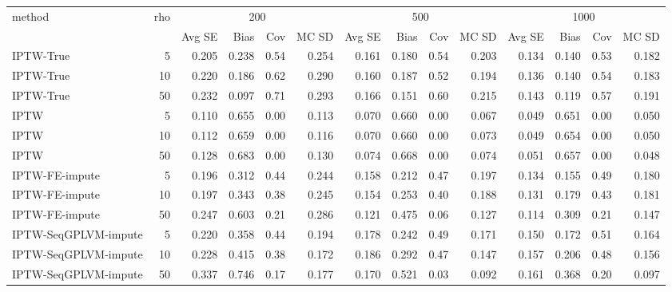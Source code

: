\begin{tabular}{l r|rrrr|rrrr|rrrr}
\toprule
method & rho & \multicolumn{4}{c|}{200} & \multicolumn{4}{c|}{500} & \multicolumn{4}{c}{1000} \\
 &  & Avg SE & Bias & Cov & MC SD & Avg SE & Bias & Cov & MC SD & Avg SE & Bias & Cov & MC SD \\
\midrule
IPTW-True & 5 & 0.205 & 0.238 & 0.54 & 0.254 & 0.161 & 0.180 & 0.54 & 0.203 & 0.134 & 0.140 & 0.53 & 0.182 \\
IPTW-True & 10 & 0.220 & 0.186 & 0.62 & 0.290 & 0.160 & 0.187 & 0.52 & 0.194 & 0.136 & 0.140 & 0.54 & 0.183 \\
IPTW-True & 50 & 0.232 & 0.097 & 0.71 & 0.293 & 0.166 & 0.151 & 0.60 & 0.215 & 0.143 & 0.119 & 0.57 & 0.191 \\
IPTW & 5 & 0.110 & 0.655 & 0.00 & 0.113 & 0.070 & 0.660 & 0.00 & 0.067 & 0.049 & 0.651 & 0.00 & 0.050 \\
IPTW & 10 & 0.112 & 0.659 & 0.00 & 0.116 & 0.070 & 0.660 & 0.00 & 0.073 & 0.049 & 0.654 & 0.00 & 0.050 \\
IPTW & 50 & 0.128 & 0.683 & 0.00 & 0.130 & 0.074 & 0.668 & 0.00 & 0.074 & 0.051 & 0.657 & 0.00 & 0.048 \\
IPTW-FE-impute & 5 & 0.196 & 0.312 & 0.44 & 0.244 & 0.158 & 0.212 & 0.47 & 0.197 & 0.134 & 0.155 & 0.49 & 0.180 \\
IPTW-FE-impute & 10 & 0.197 & 0.343 & 0.38 & 0.245 & 0.154 & 0.253 & 0.40 & 0.188 & 0.131 & 0.179 & 0.43 & 0.181 \\
IPTW-FE-impute & 50 & 0.247 & 0.603 & 0.21 & 0.286 & 0.121 & 0.475 & 0.06 & 0.127 & 0.114 & 0.309 & 0.21 & 0.147 \\
IPTW-SeqGPLVM-impute & 5 & 0.220 & 0.358 & 0.44 & 0.194 & 0.178 & 0.242 & 0.49 & 0.171 & 0.150 & 0.172 & 0.51 & 0.164 \\
IPTW-SeqGPLVM-impute & 10 & 0.228 & 0.415 & 0.38 & 0.172 & 0.186 & 0.292 & 0.47 & 0.147 & 0.157 & 0.206 & 0.48 & 0.156 \\
IPTW-SeqGPLVM-impute & 50 & 0.337 & 0.746 & 0.17 & 0.177 & 0.170 & 0.521 & 0.03 & 0.092 & 0.161 & 0.368 & 0.20 & 0.097 \\
\bottomrule
\end{tabular}